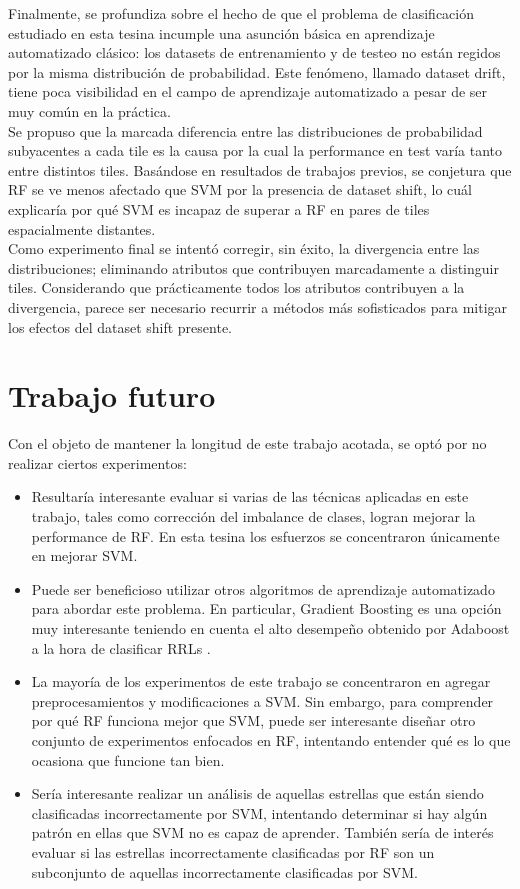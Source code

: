 Finalmente, se profundiza sobre el hecho de que el problema de clasificación estudiado en esta tesina incumple una asunción básica en aprendizaje automatizado clásico: los datasets de entrenamiento y de testeo no están regidos por la misma distribución de probabilidad. Este fenómeno, llamado dataset drift, tiene poca visibilidad en el campo de aprendizaje automatizado a pesar de ser muy común en la práctica. \\

Se propuso que la marcada diferencia entre las distribuciones de probabilidad subyacentes a cada tile es la causa por la cual la performance en test varía tanto entre distintos tiles. Basándose en resultados de trabajos previos, se conjetura que RF se ve menos afectado que SVM por la presencia de dataset shift, lo cuál explicaría por qué SVM es incapaz de superar a RF en pares de tiles espacialmente distantes. \\


Como experimento final se intentó corregir, sin éxito, la divergencia entre las distribuciones; eliminando atributos que contribuyen marcadamente a distinguir tiles. Considerando que prácticamente todos los atributos contribuyen a la divergencia, parece ser necesario recurrir a métodos más sofisticados para mitigar los efectos del dataset shift presente. \\

\section{Trabajo futuro}

Con el objeto de mantener la longitud de este trabajo acotada, se optó por no realizar ciertos experimentos: 

\begin{itemize}
\item Resultaría interesante evaluar si varias de las técnicas aplicadas en este trabajo, tales como corrección del imbalance de clases, logran mejorar la performance de RF. En esta tesina los esfuerzos se concentraron únicamente en mejorar SVM.
\item Puede ser beneficioso utilizar otros algoritmos de aprendizaje automatizado para abordar este problema. En particular, Gradient Boosting \cite{friedman2000greedy} \cite{friedman2} es una opción muy interesante teniendo en cuenta el alto desempeño obtenido por Adaboost a la hora de clasificar RRLs \cite{elorrieta}.
\item La mayoría de los experimentos de este trabajo se concentraron en agregar preprocesamientos y modificaciones a SVM. Sin embargo, para comprender por qué RF funciona mejor que SVM, puede ser interesante diseñar otro conjunto de experimentos enfocados en RF, intentando entender qué es lo que ocasiona que funcione tan bien.
\item Sería interesante realizar un análisis de aquellas estrellas que están siendo clasificadas incorrectamente por SVM, intentando determinar si hay algún patrón en ellas que SVM no es capaz de aprender. También sería de interés evaluar si las estrellas incorrectamente clasificadas por RF son un subconjunto de aquellas incorrectamente clasificadas por SVM.
\end{itemize}

